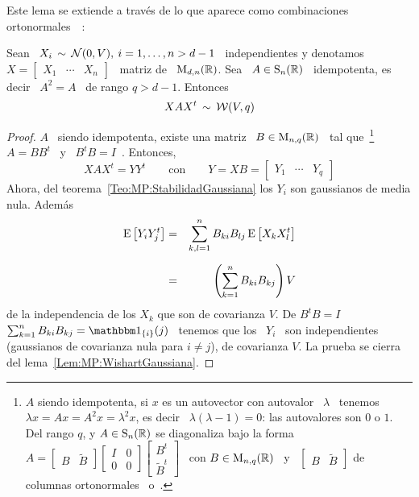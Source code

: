 Este  lema  se  extiende  a  trav\'es  de  lo  que  aparece  como  combinaciones
ortonormales~~\cite{Mui82, GupNag99, BilBre99, And03, Seb04, KotNad04}:
%
\begin{lema}\label{Lem:MP:WishartGaussianaIdempotenta}
%
  Sean \ $X_i \, \sim \, \mathcal{N}(0,V), \: i = 1, \ldots , n > d-1$ \ independientes y
  denotamos \ $X = \begin{bmatrix} X_1 & \cdots & X_n \end{bmatrix}$ \ matriz de
  \ $\mathrm{M}_{d,n}(\mathbb{R})$. Sea  \ $A \in \mathrm{S}_n(\mathbb{R})$ \  idempotenta, es decir \
  $A^2 = A$ \ de rango $q > d-1$. Entonces
  \[
  X A X^t \,\sim \, \mathcal{W}(V,q)
  \]
\end{lema}
%
\begin{proof}
  $A$ \  siendo idempotenta, existe una  matriz \ $B \in  \mathrm{M}_{n,q}(\mathbb{R})$ \ tal
  que~\footnote{$A$ siendo idempotenta, si $x$  es un autovector con autovalor \
    $\lambda$ \ tenemos  \ $\lambda x = A x  = A^2 x = \lambda^2  x$, es decir \
    $\lambda (\lambda-1) = 0$: las autovalores  son $0$ o $1$.  Del rango $q$, y
    $A \in \mathrm{S}_n(\mathbb{R})$  se diagonaliza bajo la forma \ $A  = \begin{bmatrix} B &
      \widetilde{B}   \end{bmatrix}    \begin{bmatrix}   I   &   0    \\   0   &
      0 \end{bmatrix} \begin{bmatrix} B^t\\ \widetilde{B}^t \end{bmatrix}$ \ con
    $B    \in     \mathrm{M}_{n,q}(\mathbb{R})$    \    y    \     $\begin{bmatrix}    B    &
      \widetilde{B}             \end{bmatrix}$            de            columnas
    ortonormales~\cite[Teo.~21.5.7]{Har08} o~\cite{HorJoh13}.}  \  $A = B B^t$ \
  y \ $B^t B = I$~\cite{Har08}. Entonces,
  \[
  X A  X^t =  Y Y^t \qquad  \mbox{con} \qquad Y  = X  B = \begin{bmatrix}  Y_1 &
    \cdots & Y_q \end{bmatrix}
  \]
  Ahora,    del   teorema~\ref{Teo:MP:StabilidadGaussiana}    los    $Y_i$   son
  gaussianos de media nula. Adem\'as
  \begin{eqnarray*}
  \operatorname{E}\left[ Y_i Y_j^t \right] & = & \sum_{k,l=1}^n B_{ki} B_{lj} \operatorname{E}\left[ X_k
  X_l^t \right]\\[2mm]
  & = & \left( \sum_{k=1}^n B_{ki} B_{kj} \right) V
  \end{eqnarray*}
  de la independencia de los $X_k$ que son de covarianza $V$. De $B^t B = I$ \ie
  \ $\sum_{k=1}^n  B_{ki} B_{kj} = \un_{\{i\}}(j)$  \ tenemos que los  \ $Y_i$ \
  son  independientes  (gaussianos  de  covarianza  nula  para  $i  \ne  j$),  de
  covarianza $V$.  La prueba se cierra del lema~\ref{Lem:MP:WishartGaussiana}.
\end{proof}
